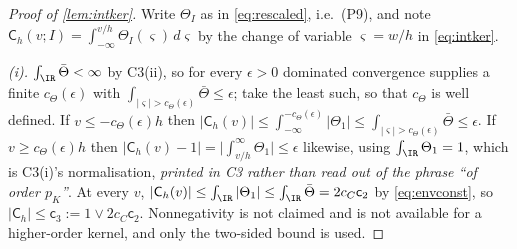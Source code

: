 \begin{proof}[Proof of \cref{lem:intker}]
Write $\Theta_{I}$ as in \eqref{eq:rescaled}, i.e.\ (P9), and note
$\mathsf C_{h}(v;I)=\int_{-\infty}^{v/h}\Theta_{I}(\varsigma)\,d\varsigma$
by the change of variable $\varsigma=w/h$ in \eqref{eq:intker}.

\emph{(i).} $\int_\IR\bar\Theta<\infty$ by C3(ii), so for every $\epsilon>0$ dominated convergence
supplies a finite $c_\Theta(\epsilon)$ with $\int_{|\varsigma|>c_\Theta(\epsilon)}\bar\Theta\le\epsilon$;
take the least such, so that $c_\Theta$ is well defined. If $v\le-c_\Theta(\epsilon)h$ then
$|\mathsf C_h(v)|\le\int_{-\infty}^{-c_\Theta(\epsilon)}|\Theta_1|\le\int_{|\varsigma|>c_\Theta(\epsilon)}\bar\Theta\le\epsilon$.
If $v\ge c_\Theta(\epsilon)h$ then
$|\mathsf C_h(v)-1|=\big|\int_{v/h}^{\infty}\Theta_1\big|\le\epsilon$ likewise, using
$\int_\IR\Theta_1=1$, which is C3(i)'s normalisation, \emph{printed in C3 rather than read out of the
phrase ``of order $p_K$''}. At every $v$, $|\mathsf C_h(v)|\le\int_\IR|\Theta_1|\le\int_\IR\bar\Theta=2c_C\mathsf c_2$
by \eqref{eq:envconst}, so $|\mathsf C_h|\le\mathsf c_3:=1\vee2c_C\mathsf c_2$. Nonnegativity is not
claimed and is not available for a higher-order kernel, and only the two-sided bound is used.


\end{proof}
